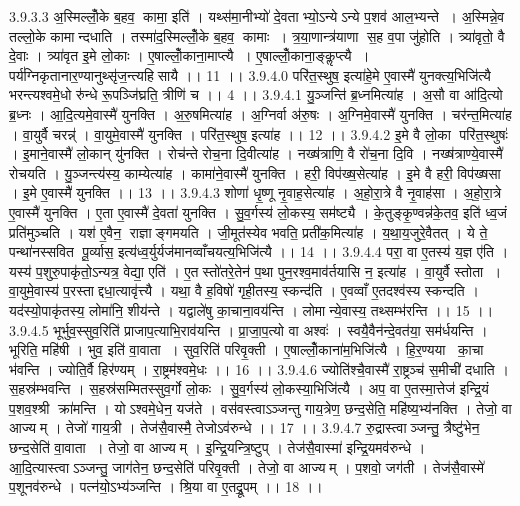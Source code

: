 3.9.3.3
अ॒स्मिल्लोँ॒के ब॒हव॒ कामा॒ इति॑ । यथ्स॑मा॒नीभ्यो॑ दे॒वताभ्यो॒ऽन्येऽन्ये प॒शव॑ आल॒भ्यन्ते । अ॒स्मिन्ने॒व तल्लो॒के कामान्दधाति । तस्मा॑द॒स्मिल्लोँ॒के ब॒हव॒ कामाः । त्र॒या॒णान्त्र॑याणा स॒ह व॒पा जु॑होति । त्र्या॑वृतो॒ वै दे॒वाः । त्र्या॑वृत इ॒मे लो॒काः । ए॒षाल्लोँ॒काना॒माप्त्यै । ए॒षाल्लोँ॒काना॒ङ्कॢप्त्यै । पर्य॑ग्निकृतानार॒ण्यानुथ्सृ॑ज॒न्त्यहि॑सायै ।। 11 ।।
3.9.4.0
परि॑त॒स्थुष॒ इत्या॑हे॒मे ए॒वास्मै॑ युनक्त्य॒भिजि॑त्यै भरन्त्यश्वमे॒धो रु॑न्धे रू॒पञ्जि॑घ्रति॒ त्रीणि॑ च ।। 4 ।।
3.9.4.1
यु॒ञ्जन्ति॑ ब्र॒ध्नमित्या॑ह । अ॒सौ वा आ॑दि॒त्यो ब्र॒ध्नः । आ॒दि॒त्यमे॒वास्मै॑ युनक्ति । अ॒रु॒षमित्या॑ह । अ॒ग्निर्वा अ॑रु॒षः । अ॒ग्निमे॒वास्मै॑ युनक्ति । चर॑न्त॒मित्या॑ह । वा॒युर्वै चरन्न्॑ । वा॒युमे॒वास्मै॑ युनक्ति । परि॑त॒स्थुष॒ इत्या॑ह ।। 12 ।।
3.9.4.2
इ॒मे वै लो॒का परि॑त॒स्थुषः॑ । इ॒माने॒वास्मै॑ लो॒कान् यु॑नक्ति । रोच॑न्ते रोच॒ना दि॒वीत्या॑ह । नख्ष॑त्राणि॒ वै रो॑च॒ना दि॒वि । नख्ष॑त्राण्ये॒वास्मै॑ रोचयति । यु॒ञ्जन्त्य॑स्य॒ काम्येत्या॑ह । कामा॑ने॒वास्मै॑ युनक्ति । हरी॒ विप॑ख्ष॒सेत्या॑ह । इ॒मे वै हरी॒ विप॑ख्षसा । इ॒मे ए॒वास्मै॑ युनक्ति ।। 13 ।।
3.9.4.3
शोणा॑ धृ॒ष्णू नृ॒वाह॒सेत्या॑ह । अ॒हो॒रा॒त्रे वै नृ॒वाह॑सा । अ॒हो॒रा॒त्रे ए॒वास्मै॑ युनक्ति । ए॒ता ए॒वास्मै॑ दे॒वता॑ युनक्ति । सु॒व॒र्गस्य॑ लो॒कस्य॒ सम॑ष्ट्यै । के॒तुङ्कृ॒ण्वन्न॑के॒तव॒ इति॑ ध्व॒जं प्रति॑मुञ्चति । यश॑ ए॒वैन॒॒ राज्ञाङ्गमयति । जी॒मूत॑स्येव भवति॒ प्रती॑क॒मित्या॑ह । य॒था॒य॒जुरे॒वैतत् । ये ते॒ पन्था॑नस्सवित पू॒र्व्यास॒ इत्य॑ध्व॒र्युर्यज॑मानव्वाँचयत्य॒भिजि॑त्यै ।। 14 ।।
3.9.4.4
परा॒ वा ए॒तस्य॑ य॒ज्ञ ए॑ति । यस्य॑ प॒शुरु॒पाकृ॑तो॒ऽन्यत्र॒ वेद्या॒ एति॑ । ए॒तस्तो॑तरे॒तेन॑ प॒था पुन॒रश्व॒माव॑र्तयासि न॒ इत्या॑ह । वा॒युर्वै स्तोता । वा॒युमे॒वास्य॑ प॒रस्ताद्दधा॒त्यावृ॑त्त्यै । यथा॒ वै ह॒विषो॑ गृही॒तस्य॒ स्कन्द॑ति । ए॒वव्वाँ ए॒तदश्व॑स्य स्कन्दति । यद॑स्यो॒पाकृ॑तस्य॒ लोमा॑नि॒ शीय॑न्ते । यद्वाले॑षु का॒चाना॒वय॑न्ति । लोमान्ये॒वास्य॒ तथ्सम्भ॑रन्ति ।। 15 ।।
3.9.4.5
भूर्भुव॒स्सुव॒रिति॑ प्राजाप॒त्याभि॒राव॑यन्ति । प्रा॒जा॒प॒त्यो वा अश्वः॑ । स्वयै॒वैन॑न्दे॒वत॑या॒ सम॑र्धयन्ति । भूरिति॒ महि॑षी । भुव॒ इति॑ वा॒वाता । सुव॒रिति॑ परिवृ॒क्ती । ए॒षाल्लोँ॒काना॑म॒भिजि॑त्यै । हि॒र॒ण्यया का॒चा भ॑वन्ति । ज्योति॒र्वै हिर॑ण्यम् । रा॒ष्ट्रम॑श्वमे॒धः ।। 16 ।।
3.9.4.6
ज्योति॑श्चै॒वास्मै॑ रा॒ष्ट्रञ्च॑ स॒मीची॑ दधाति । स॒हस्र॑म्भवन्ति । स॒हस्र॑सम्मितस्सुव॒र्गो लो॒कः । सु॒व॒र्गस्य॑ लो॒कस्या॒भिजि॑त्यै । अप॒ वा ए॒तस्मा॒त्तेज॑ इन्द्रि॒यं प॒शव॒श्श्री क्रा॑मन्ति । योऽश्वमे॒धेन॒ यज॑ते । वस॑वस्त्वाऽञ्जन्तु गाय॒त्रेण॒ छन्द॒सेति॒ महि॑ष्य॒भ्य॑नक्ति । तेजो॒ वा आज्यम् । तेजो॑ गाय॒त्री । तेज॑सै॒वास्मै॒ तेजोऽव॑रुन्धे ।। 17 ।।
3.9.4.7
रु॒द्रास्त्वाञ्जन्तु॒ त्रैष्टु॑भेन॒ छन्द॒सेति॑ वा॒वाता । तेजो॒ वा आज्यम् । इ॒न्द्रि॒यन्त्रि॒ष्टुप् । तेज॑सै॒वास्मा॑ इन्द्रि॒यमव॑रुन्धे । आ॒दि॒त्यास्त्वाऽञ्जन्तु॒ जाग॑तेन॒ छन्द॒सेति॑ परिवृ॒क्ती । तेजो॒ वा आज्यम् । प॒शवो॒ जग॑ती । तेज॑सै॒वास्मे॑ प॒शूनव॑रुन्धे । पत्न॑यो॒ऽभ्य॑ञ्जन्ति । श्रि॒या वा ए॒तद्रू॒पम् ।। 18 ।।

